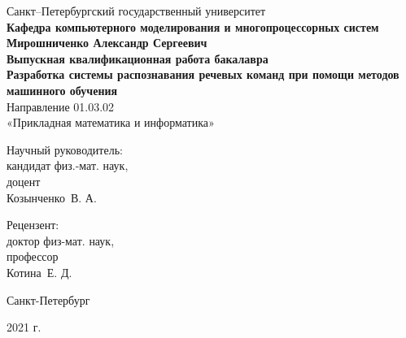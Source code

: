 \begin{titlepage}
\begin{center}
Санкт--Петербургский государственный университет \\
\textbf{Кафедра компьютерного моделирования и многопроцессорных систем}
\vspace{47mm} \\
\textbf{\large Мирошниченко Александр Сергеевич} \\[10mm]
\textbf{\large Выпускная квалификационная работа бакалавра} \\[10mm]
\textbf{\large Разработка системы распознавания речевых команд при помощи методов машинного обучения} \\
Направление 01.03.02 \\
«Прикладная математика и информатика»\\[20mm]
\begin{flushright}
Научный руководитель: \\
кандидат физ.-мат. наук, \\доцент \\Козынченко~В. А.\\
\end{flushright}
\begin{flushright}
Рецензент: \\
доктор физ-мат. наук, \\профессор  \\Котина~Е. Д.
\end{flushright}
\vfill 
{Санкт-Петербург}
\par{2021 г.}
\end{center}
\end{titlepage}
\addtocounter{page}{1}